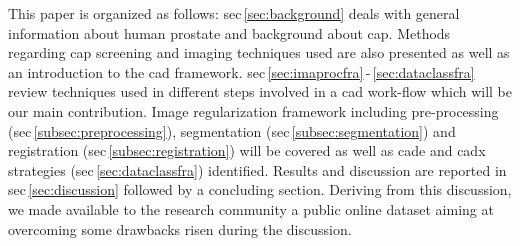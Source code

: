 This paper is organized as follows: \acs{sec}\,\ref{sec:background} deals with general information about human prostate and background about \ac{cap}. Methods regarding \ac{cap} screening and imaging techniques used are also presented as well as an introduction to the \acs{cad} framework. \acs{sec}\,\ref{sec:imaprocfra}\,-\,\ref{sec:dataclassfra} review techniques used in different steps involved in a \acs{cad} work-flow which will be our main contribution. Image regularization framework including pre-processing (\acs{sec}\,\ref{subsec:preprocessing}), segmentation (\acs{sec}\,\ref{subsec:segmentation}) and registration (\acs{sec}\,\ref{subsec:registration}) will be covered as well as \ac{cade} and \ac{cadx} strategies (\acs{sec}\,\ref{sec:dataclassfra}) identified. Results and discussion are reported in \acs{sec}\,\ref{sec:discussion} followed by a concluding section. Deriving from this discussion, we made available to the research community a public online dataset aiming at overcoming some drawbacks risen during the discussion.

